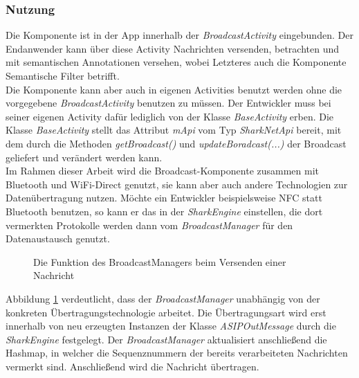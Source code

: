 \subsubsection{Nutzung}
Die Komponente ist in der App innerhalb der \textit{BroadcastActivity} eingebunden. Der Endanwender kann über diese Activity Nachrichten versenden, betrachten und mit semantischen Annotationen versehen, wobei Letzteres auch die Komponente Semantische Filter betrifft.
\\Die Komponente kann aber auch in eigenen Activities benutzt werden ohne die vorgegebene \textit{BroadcastActivity} benutzen zu müssen. Der Entwickler muss bei seiner eigenen Activity dafür lediglich von der Klasse \textit{BaseActivity} erben. Die Klasse \textit{BaseActivity} stellt das Attribut \textit{mApi} vom Typ \textit{SharkNetApi} bereit, mit dem durch die Methoden \textit{getBroadcast()} und \textit{updateBoradcast(...)} der Broadcast geliefert und verändert werden kann.
\\Im Rahmen dieser Arbeit wird die Broadcast-Komponente zusammen mit Bluetooth und WiFi-Direct genutzt, sie kann aber auch andere Technologien zur Datenübertragung nutzen. Möchte ein Entwickler beispielsweise NFC statt Bluetooth benutzen, so kann er das in der \textit{SharkEngine} einstellen, die dort vermerkten Protokolle werden dann vom \textit{BroadcastManager} für den Datenaustausch genutzt.
\begin{figure}[H]
	\centering
	\hspace*{1cm}
	\caption{Die Funktion des BroadcastManagers beim Versenden einer Nachricht}
	\label{fig:sendOperation}
\end{figure}
Abbildung \ref{fig:sendOperation} verdeutlicht, dass der \textit{BroadcastManager} unabhängig von der konkreten Übertragungstechnologie arbeitet. Die Übertragungsart wird erst innerhalb von neu erzeugten Instanzen der Klasse \textit{ASIPOutMessage} durch die \textit{SharkEngine} festgelegt. Der \textit{BroadcastManager} aktualisiert anschließend die Hashmap, in welcher die Sequenznummern der bereits verarbeiteten Nachrichten vermerkt sind. Anschließend wird die Nachricht übertragen.\newpage  
